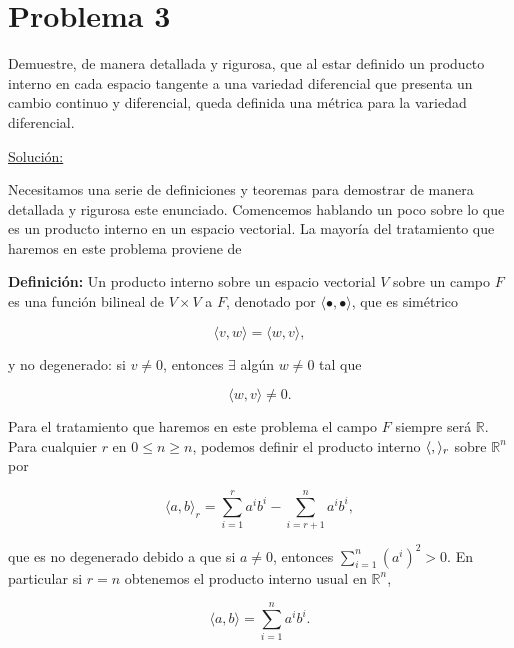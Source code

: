 \documentclass[a4paper,10pt]{article}
\numberwithin{equation}{section}
\newcommand{\definicion}{\textbf{Definición: }}
\begin{document}
\section{Problema 3}

Demuestre, de manera detallada y rigurosa, que al estar definido un producto interno 
en cada espacio tangente a una variedad diferencial que presenta un cambio continuo 
y diferencial, queda definida una métrica para la variedad diferencial.

\vspace{.3cm}

\underline{Solución:} \vspace{.3cm}

Necesitamos una serie de definiciones y teoremas para demostrar de manera detallada 
y rigurosa este enunciado. Comencemos hablando un poco sobre lo que es un producto 
interno en un espacio vectorial. La mayoría del tratamiento que haremos en este 
problema proviene de 

\vspace{.3cm}

\definicion Un producto interno sobre un espacio vectorial $V$ sobre un campo $F$ es 
una función bilineal de $V \times V$ a $F$, denotado por $\langle \bullet, \bullet \rangle$, que 
es simétrico

\begin{equation}
 \langle v, w \rangle = \langle w, v \rangle,
\end{equation}

y no degenerado: si $v\ne 0$, entonces $\exists$ algún $w \ne 0$ tal que

\begin{equation}
 \langle w, v \rangle \ne 0.
\end{equation}

Para el tratamiento que haremos en este problema el campo $F$ siempre será $\mathbb{R}$. Para 
cualquier $r$ en $0 \leq n \geq n$, podemos definir el producto interno 
$\langle \space , \space \rangle_r$ sobre $\mathbb{R}^n$ por 

\begin{equation}
 \langle a, b \rangle_r = \sum_{i=1}^r a^ib^i - \sum_{i=r+1}^n a^ib^i,
\end{equation}

que es no degenerado debido a que si $a \ne 0$, entonces $\sum_{i=1}^n (a^i)^2 > 0$. 
En particular si $r = n$ obtenemos el producto interno usual en $\mathbb{R}^n$,

\begin{equation}
 \langle a, b \rangle = \sum_{i=1}^n a^ib^i.
\end{equation}
\end{document}
